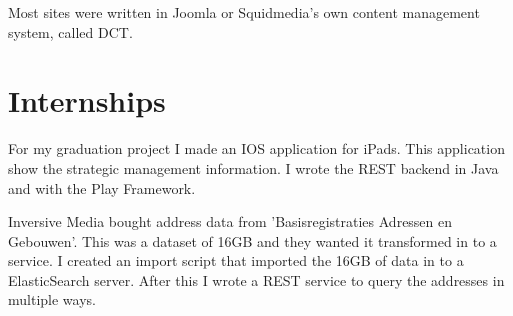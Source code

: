 \documentclass[]{deedy-resume-openfont}
\begin{document}
\begin{minipage}[t]{0.66\textwidth}
Most sites were written in Joomla or Squidmedia's own content management system, called DCT.
\sectionsep


\section{Internships}
For my graduation project I made an IOS application for iPads. 
This application show the strategic management information. 
I wrote the REST backend in Java and with the Play Framework.
\sectionsep

Inversive Media bought address data from 'Basisregistraties Adressen en Gebouwen'.
This was a dataset of 16GB and they wanted it transformed in to a service.
I created an import script that imported the 16GB of data in to a ElasticSearch server.
After this I wrote a REST service to query the addresses in multiple ways.
\sectionsep


\end{minipage} 
\end{document}
